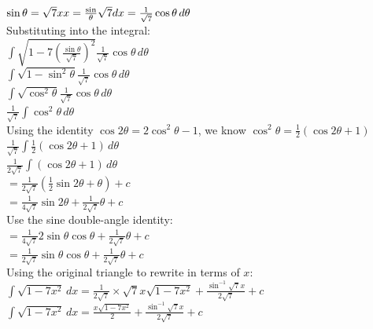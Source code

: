 \documentclass[../main.tex]{subfiles}
\begin{document}
\begin{enumerate}
    \(\sin{\theta}=\sqrt{7}x\\
    x=\frac\sin{\theta}{\sqrt{7}}\\
    dx=\frac{1}{\sqrt{7}}\cos{\theta}\,d\theta\)\\

    Substituting into the integral:\\
    \(\int \sqrt{1-7(\frac{\sin{\theta}}{\sqrt{7}})^2}\frac{1}{\sqrt{7}}\cos{\theta}\,d\theta\)\\

    \(\int \sqrt{1-\sin^2{\theta}}\frac{1}{\sqrt{7}}\cos{\theta}\,d\theta\)\\

    \(\int \sqrt{\cos^2{\theta}}\frac{1}{\sqrt{7}}\cos{\theta}\,d\theta\)\\

    \(\frac{1}{\sqrt{7}}\int \cos^2{\theta}\,d\theta\)\\
    
    Using the identity \(\cos{2\theta}=2\cos^2{\theta}-1\), we know \(\cos^2{\theta}=\frac{1}{2}(\cos{2\theta}+1)\)\\

    \(\frac{1}{\sqrt{7}}\int \frac{1}{2}(\cos{2\theta}+1)\,d\theta\)\\
    \(\frac{1}{2\sqrt{7}}\int (\cos{2\theta}+1)\,d\theta\)\\
    
    \(=\frac{1}{2\sqrt{7}}(\frac{1}{2}\sin{2\theta}+\theta)+c\)\\

    \(=\frac{1}{4\sqrt{7}}\sin{2\theta}+\frac{1}{2\sqrt{7}}\theta+c\)\\

    Use the sine double-angle identity:\\
    \(=\frac{1}{4\sqrt{7}}2\sin{\theta}\cos{\theta}+\frac{1}{2\sqrt{7}}\theta+c\)\\

    \(=\frac{1}{2\sqrt{7}}\sin{\theta}\cos{\theta}+\frac{1}{2\sqrt{7}}\theta+c\)\\

    Using the original triangle to rewrite in terms of \(x\):\\
    \(\int \sqrt{1-7x^2}\,dx=\frac{1}{2\sqrt{7}}\times \sqrt{7}x\sqrt{1-7x^2}+\frac{\sin^{-1}{\sqrt{7}x}}{2\sqrt{7}}+c\)\\

    \(\int \sqrt{1-7x^2}\,dx=\frac{x\sqrt{1-7x^2}}{2}+\frac{\sin^{-1}{\sqrt{7}x}}{2\sqrt{7}}+c\)\\
    

\end{enumerate}
\end{document}
